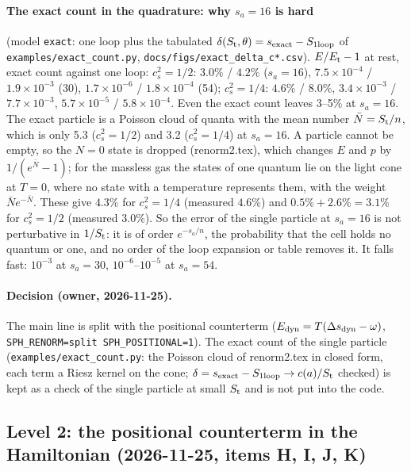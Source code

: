 \documentclass[11pt,aps,preprint,nofootinbib,superscriptaddress,tightenlines]{revtex4-2}
\let\oldparagraph\paragraph
\renewcommand{\paragraph}{\par\bigskip\oldparagraph}
\begin{document}
\paragraph{The exact count in the quadrature: why $s_a=16$ is hard} (model \texttt{exact}: one loop plus the tabulated
$\delta(S_{\rm t},\theta)=s_{\rm exact}-S_{\rm 1loop}$ of \nolinkurl{examples/exact_count.py}, \texttt{docs/figs/exact\_delta\_c*.csv}).  $E/E_{\rm t}-1$ at rest,
exact count against one loop: $c_s^2=1/2$: $3.0\%$ / $4.2\%$ ($s_a=16$), $7.5\times10^{-4}$ / $1.9\times10^{-3}$ (30), $1.7\times10^{-6}$ /
$1.8\times10^{-4}$ (54); $c_s^2=1/4$: $4.6\%$ / $8.0\%$, $3.4\times10^{-3}$ / $7.7\times10^{-3}$, $5.7\times10^{-5}$ / $5.8\times10^{-4}$.  Even the exact
count leaves 3--5\% at $s_a=16$.  The exact particle is a Poisson cloud of quanta with the mean number $\bar N=S_{\rm t}/n$, which is only 5.3
($c_s^2=1/2$) and 3.2 ($c_s^2=1/4$) at $s_a=16$.  A particle cannot be empty, so the $N=0$ state is dropped (renorm2.tex), which changes $E$ and $p$ by
$1/(e^{\bar N}-1)$; for the massless gas the states of one quantum lie on the light cone at $T=0$, where no state with a temperature represents them,
with the weight $\bar Ne^{-\bar N}$.  These give $4.3\%$ for $c_s^2=1/4$ (measured $4.6\%$) and $0.5\%+2.6\%=3.1\%$ for $c_s^2=1/2$ (measured $3.0\%$).  So
the error of the single particle at $s_a=16$ is not perturbative in $1/S_{\rm t}$: it is of order $e^{-s_a/n}$, the probability that the cell holds
no quantum or one, and no order of the loop expansion or table removes it.  It falls fast: $10^{-3}$ at $s_a=30$, $10^{-6}$--$10^{-5}$ at $s_a=54$.

\paragraph{Decision (owner, 2026-11-25).}  The main line is split with the positional counterterm ($E_{\rm dyn}=T(\Delta s_{\rm dyn}-\omega)$,
\texttt{SPH\_RENORM=split SPH\_POSITIONAL=1}).  The exact count of the single particle (\nolinkurl{examples/exact_count.py}: the Poisson cloud of
renorm2.tex in closed form, each term a Riesz kernel on the cone; $\delta=s_{\rm exact}-S_{\rm 1loop}\to c(a)/S_{\rm t}$ checked) is kept as a check
of the single particle at small $S_{\rm t}$ and is not put into the code.

\subsection*{Level 2: the positional counterterm in the Hamiltonian (2026-11-25, items H, I, J, K)}
\end{document}
